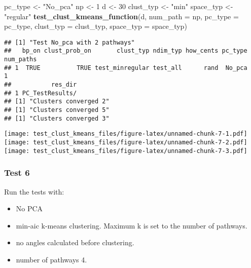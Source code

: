 \documentclass[
]{article}
\newenvironment{Shaded}{\begin{snugshade}}{\end{snugshade}}
\newcommand{\AttributeTok}[1]{\textcolor[rgb]{0.13,0.29,0.53}{#1}}
\newcommand{\DecValTok}[1]{\textcolor[rgb]{0.00,0.00,0.81}{#1}}
\newcommand{\FunctionTok}[1]{\textcolor[rgb]{0.13,0.29,0.53}{\textbf{#1}}}
\newcommand{\NormalTok}[1]{#1}
\newcommand{\OtherTok}[1]{\textcolor[rgb]{0.56,0.35,0.01}{#1}}
\newcommand{\StringTok}[1]{\textcolor[rgb]{0.31,0.60,0.02}{#1}}
\providecommand{\tightlist}{%
  \setlength{\itemsep}{0pt}\setlength{\parskip}{0pt}}
\begin{document}
\begin{Shaded}
\begin{Highlighting}[]
\NormalTok{pc\_type }\OtherTok{\textless{}{-}} \StringTok{"No\_pca"}
\NormalTok{np }\OtherTok{\textless{}{-}} \DecValTok{1}
\NormalTok{d }\OtherTok{\textless{}{-}} \DecValTok{30}
\NormalTok{clust\_typ }\OtherTok{\textless{}{-}} \StringTok{"min"}
\NormalTok{space\_typ }\OtherTok{\textless{}{-}} \StringTok{"regular"}
\FunctionTok{test\_clust\_kmeans\_function}\NormalTok{(d,}
                           \AttributeTok{num\_path =}\NormalTok{ np,}
                           \AttributeTok{pc\_type =}\NormalTok{ pc\_type,}
                           \AttributeTok{clust\_typ =}\NormalTok{ clust\_typ,}
                           \AttributeTok{space\_typ =}\NormalTok{ space\_typ)}
\end{Highlighting}
\end{Shaded}

\begin{verbatim}
## [1] "Test No_pca with 2 pathways"
##   bp_on clust_prob_on       clust_typ ndim_typ how_cents pc_type num_paths
## 1  TRUE          TRUE test_minregular test_all      rand  No_pca         1
##           res_dir
## 1 PC_TestResults/
## [1] "Clusters converged 2"
## [1] "Clusters converged 5"
## [1] "Clusters converged 3"
\end{verbatim}

\texttt{[image: test\_clust\_kmeans\_files/figure-latex/unnamed-chunk-7-1.pdf]}
\texttt{[image: test\_clust\_kmeans\_files/figure-latex/unnamed-chunk-7-2.pdf]}
\texttt{[image: test\_clust\_kmeans\_files/figure-latex/unnamed-chunk-7-3.pdf]}

\hypertarget{test-6}{%
\subsubsection{Test 6}\label{test-6}}

Run the tests with:

\begin{itemize}
\tightlist
\item
  No PCA
\item
  min-aic k-means clustering. Maximum k is set to the number of
  pathways.
\item
  no angles calculated before clustering.
\item
  number of pathways 4.
\end{itemize}
\end{document}
